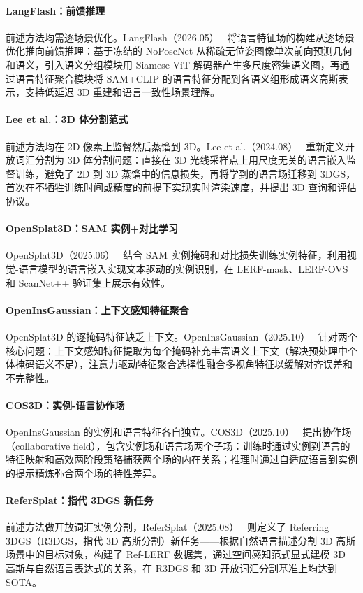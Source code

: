 \paragraph{LangFlash：前馈推理} 前述方法均需逐场景优化。LangFlash（2026.05）~\cite{2605_23287} 将语言特征场的构建从逐场景优化推向前馈推理：基于冻结的 NoPoseNet 从稀疏无位姿图像单次前向预测几何和语义，引入语义分组模块用 Siamese ViT 解码器产生多尺度密集语义图，再通过语言特征聚合模块将 SAM+CLIP 的语言特征分配到各语义组形成语义高斯表示，支持低延迟 3D 重建和语言一致性场景理解。

\paragraph{Lee et al.：3D 体分割范式} 前述方法均在 2D 像素上监督然后蒸馏到 3D。Lee et al.（2024.08）~\cite{2408_07416} 重新定义开放词汇分割为 3D 体分割问题：直接在 3D 光线采样点上用尺度无关的语言嵌入监督训练，避免了 2D 到 3D 蒸馏中的信息损失，再将学到的语言场迁移到 3DGS，首次在不牺牲训练时间或精度的前提下实现实时渲染速度，并提出 3D 查询和评估协议。

\paragraph{OpenSplat3D：SAM 实例+对比学习} OpenSplat3D（2025.06）~\cite{2506_07697} 结合 SAM 实例掩码和对比损失训练实例特征，利用视觉-语言模型的语言嵌入实现文本驱动的实例识别，在 LERF-mask、LERF-OVS 和 ScanNet++ 验证集上展示有效性。

\paragraph{OpenInsGaussian：上下文感知特征聚合} OpenSplat3D 的逐掩码特征缺乏上下文。OpenInsGaussian（2025.10）~\cite{2510_18253} 针对两个核心问题：上下文感知特征提取为每个掩码补充丰富语义上下文（解决预处理中个体掩码语义不足），注意力驱动特征聚合选择性融合多视角特征以缓解对齐误差和不完整性。

\paragraph{COS3D：实例-语言协作场} OpenInsGaussian 的实例和语言特征各自独立。COS3D（2025.10）~\cite{2510_20238} 提出协作场（collaborative field），包含实例场和语言场两个子场：训练时通过实例到语言的特征映射和高效两阶段策略捕获两个场的内在关系；推理时通过自适应语言到实例的提示精炼弥合两个场的特性差异。

\paragraph{ReferSplat：指代 3DGS 新任务} 前述方法做开放词汇实例分割，ReferSplat（2025.08）~\cite{2508_08252} 则定义了 Referring 3DGS（R3DGS，指代 3D 高斯分割）新任务——根据自然语言描述分割 3D 高斯场景中的目标对象，构建了 Ref-LERF 数据集，通过空间感知范式显式建模 3D 高斯与自然语言表达式的关系，在 R3DGS 和 3D 开放词汇分割基准上均达到 SOTA。

